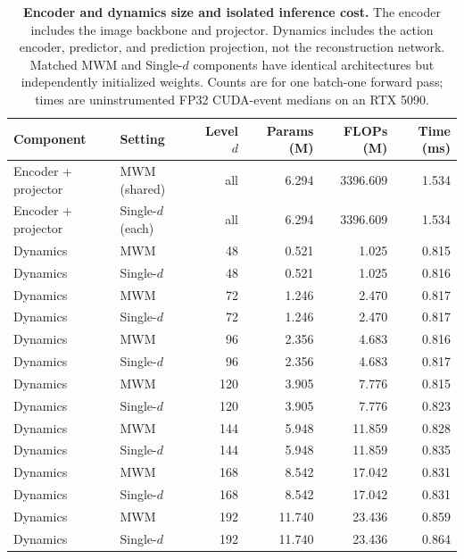 \begin{table}[t]
    \centering
    \caption{\textbf{Encoder and dynamics size and isolated inference cost.} The encoder includes the image backbone and projector. Dynamics includes the action encoder, predictor, and prediction projection, not the reconstruction network. Matched MWM and Single-\(d\) components have identical architectures but independently initialized weights. Counts are for one batch-one forward pass; times are uninstrumented FP32 CUDA-event medians on an RTX 5090.}
    \label{tab:component_profiles}
    {\small
    \begin{tabular}{@{}llrrrr@{}}
        \toprule
        Component & Setting & Level $d$ & Params (M) & FLOPs (M) & Time (ms) \\
        \midrule
        Encoder + projector & MWM (shared) & all & 6.294 & 3396.609 & 1.534 \\
        Encoder + projector & Single-\(d\) (each) & all & 6.294 & 3396.609 & 1.534 \\
        \midrule
        Dynamics & MWM & 48 & 0.521 & 1.025 & 0.815 \\
        Dynamics & Single-\(d\) & 48 & 0.521 & 1.025 & 0.816 \\
        Dynamics & MWM & 72 & 1.246 & 2.470 & 0.817 \\
        Dynamics & Single-\(d\) & 72 & 1.246 & 2.470 & 0.817 \\
        Dynamics & MWM & 96 & 2.356 & 4.683 & 0.816 \\
        Dynamics & Single-\(d\) & 96 & 2.356 & 4.683 & 0.817 \\
        Dynamics & MWM & 120 & 3.905 & 7.776 & 0.815 \\
        Dynamics & Single-\(d\) & 120 & 3.905 & 7.776 & 0.823 \\
        Dynamics & MWM & 144 & 5.948 & 11.859 & 0.828 \\
        Dynamics & Single-\(d\) & 144 & 5.948 & 11.859 & 0.835 \\
        Dynamics & MWM & 168 & 8.542 & 17.042 & 0.831 \\
        Dynamics & Single-\(d\) & 168 & 8.542 & 17.042 & 0.831 \\
        Dynamics & MWM & 192 & 11.740 & 23.436 & 0.859 \\
        Dynamics & Single-\(d\) & 192 & 11.740 & 23.436 & 0.864 \\
        \bottomrule
    \end{tabular}
    }
\end{table}
\FloatBarrier

